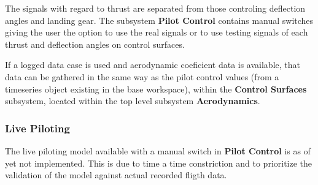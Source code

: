 The signals with regard to thrust are separated from those controling deflection angles and landing gear. The subsystem \textbf{Pilot Control} contains manual switches giving the user the option to use the real signals or to use testing signals of each thrust and deflection angles on control surfaces.

If a logged data case is used and aerodynamic coeficient data is available, that data can be gathered in the same way as the pilot control values (from a timeseries object existing in the base workspace), within the \textbf{Control Surfaces} subsystem, located within the top level subsystem \textbf{Aerodynamics}.

\subsubsection{Live Piloting}

The live piloting model available with a manual switch in \textbf{Pilot Control} is as of yet not implemented. This is due to time a time constriction and to prioritize the validation of the model against actual recorded fligth data.
